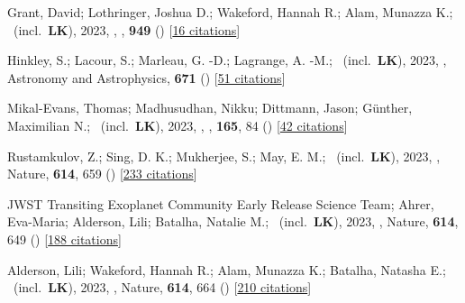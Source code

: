 \item[{\color{numcolor}\scriptsize87}] Grant, David; Lothringer, Joshua D.; Wakeford, Hannah R.; Alam, Munazza K.; \etal\ (incl.\ \textbf{LK}), 2023, , \apj, \textbf{949} () [\href{https://ui.adsabs.harvard.edu/abs/2023ApJ...949L..15G}{16 citations}]

\item[{\color{numcolor}\scriptsize86}] Hinkley, S.; Lacour, S.; Marleau, G. -D.; Lagrange, A. -M.; \etal\ (incl.\ \textbf{LK}), 2023, , Astronomy and Astrophysics, \textbf{671} () [\href{https://ui.adsabs.harvard.edu/abs/2023A&A...671L...5H}{51 citations}]

\item[{\color{numcolor}\scriptsize85}] Mikal-Evans, Thomas; Madhusudhan, Nikku; Dittmann, Jason; G{\"u}nther, Maximilian N.; \etal\ (incl.\ \textbf{LK}), 2023, , \aj, \textbf{165}, 84 () [\href{https://ui.adsabs.harvard.edu/abs/2023AJ....165...84M}{42 citations}]

\item[{\color{numcolor}\scriptsize84}] Rustamkulov, Z.; Sing, D. K.; Mukherjee, S.; May, E. M.; \etal\ (incl.\ \textbf{LK}), 2023, , Nature, \textbf{614}, 659 () [\href{https://ui.adsabs.harvard.edu/abs/2023Natur.614..659R}{233 citations}]

\item[{\color{numcolor}\scriptsize83}] JWST Transiting Exoplanet Community Early Release Science Team; Ahrer, Eva-Maria; Alderson, Lili; Batalha, Natalie M.; \etal\ (incl.\ \textbf{LK}), 2023, , Nature, \textbf{614}, 649 () [\href{https://ui.adsabs.harvard.edu/abs/2023Natur.614..649J}{188 citations}]

\item[{\color{numcolor}\scriptsize82}] Alderson, Lili; Wakeford, Hannah R.; Alam, Munazza K.; Batalha, Natasha E.; \etal\ (incl.\ \textbf{LK}), 2023, , Nature, \textbf{614}, 664 () [\href{https://ui.adsabs.harvard.edu/abs/2023Natur.614..664A}{210 citations}]

